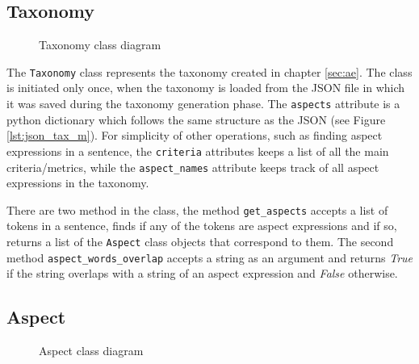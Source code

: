 \subsection{Taxonomy}
\begin{figure}[H]
\centering
{}
\caption{Taxonomy class diagram}
\label{img:taxonomyclass}
\end{figure}

The \texttt{Taxonomy} class represents the taxonomy created in chapter \ref{sec:ae}. The class is initiated only once, when the taxonomy is loaded from the JSON file in which it was saved during the taxonomy generation phase. The \texttt{aspects} attribute is a python dictionary which follows the same structure as the JSON (see Figure \ref{lst:json_tax_m}).  For simplicity of other operations, such as finding aspect expressions in a sentence, the \texttt{criteria} attributes keeps a list of all the main criteria/metrics, while the \texttt{aspect\_names} attribute keeps track of all aspect expressions in the taxonomy.

There are two method in the class, the method \texttt{get\_aspects} accepts a list of tokens in a sentence, finds if any of the tokens are aspect expressions and if so, returns a list of the \texttt{Aspect} class objects that correspond to them. The second method \texttt{aspect\_words\_overlap} accepts a string as an argument and returns \textit{True} if the string overlaps with a string of an aspect expression and \textit{False} otherwise.


\subsection{Aspect}
\begin{figure}[H]
\centering
{}
\caption{Aspect class diagram}
\label{img:aspectclass}
\end{figure}

